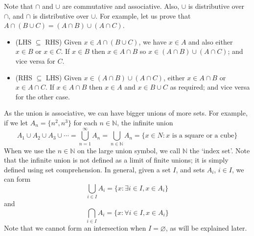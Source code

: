 Note that $\cap$ and $\cup$ are commutative and associative. Also, $\cup$ is distributive over $\cap$, and $\cap$ is distributive over $\cup$. For example, let us prove that $A \cap (B \cup C) = (A \cap B) \cup (A \cap C)$.
\begin{itemize}
	\item (LHS $\subseteq$ RHS) Given $x \in A \cap (B \cup C)$, we have $x \in A$ and also either $x \in B$ or $x \in C$. If $x \in B$ then $x \in A \cap B$ so $x \in (A \cap B) \cup (A \cap C)$; and vice versa for $C$.
	\item (RHS $\subseteq$ LHS) Given $x \in (A \cap B) \cup (A \cap C)$, either $x \in A \cap B$ or $x \in A \cap C$. If $x \in A \cap B$ then $x \in A$ and $x \in B \cup C$ as required; and vice versa for the other case.
\end{itemize}
As the union is associative, we can have bigger unions of more sets. For example, if we let $A_n = \{ n^2, n^3 \}$ for each $n \in \mathbb N$, the infinite union
\[ A_1 \cup A_2 \cup A_3 \cup \cdots = \bigcup_{n=1}^\infty A_n = \bigcup_{n \in \mathbb N} A_n = \{ x \in N: x \text{ is a square or a cube} \} \]
When we use the $n \in \mathbb N$ on the large union symbol, we call $\mathbb N$ the `index set'. Note that the infinite union is not defined as a limit of finite unions; it is simply defined using set comprehension. In general, given a set $I$, and sets $A_i$, $i \in I$, we can form
\[ \bigcup_{i \in I}A_i = \{ x: \exists i \in I, x \in A_i \} \]
and
\[ \bigcap_{i \in I}A_i = \{ x: \forall i \in I, x \in A_i \} \]
Note that we cannot form an intersection when $I = \varnothing$, as will be explained later.

